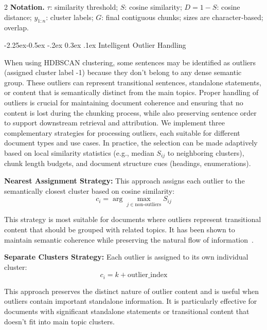 \documentclass[10pt,letterpaper]{article}
\makeatletter
\let\cite\citep
\renewcommand{\subsubsection}{\@startsection{subsubsection}{3}{\z@}%
                                     {-2.25ex\@plus -0.5ex \@minus -.2ex}%
                                     {0.3ex \@plus .1ex}%
                                     {\normalfont\normalsize\itshape}}
\makeatother
\begin{document}
\begin{multicols}{2}
\textbf{Notation.} $\tau$: similarity threshold; $S$: cosine similarity; $D{=}1{-}S$: cosine distance; $y_{1:n}$: cluster labels; $G$: final contiguous chunks; sizes are character‑based; overlap.

\subsubsection{Intelligent Outlier Handling}

\vspace{0.5em}
When using HDBSCAN clustering, some sentences may be identified as outliers (assigned cluster label -1) because they don't belong to any dense semantic group. These outliers can represent transitional sentences, standalone statements, or content that is semantically distinct from the main topics. Proper handling of outliers is crucial for maintaining document coherence and ensuring that no content is lost during the chunking process, while also preserving sentence order to support downstream retrieval and attribution. We implement three complementary strategies for processing outliers, each suitable for different document types and use cases. In practice, the selection can be made adaptively based on local similarity statistics (e.g., median $S_{ij}$ to neighboring clusters), chunk length budgets, and document structure cues (headings, enumerations).

\textbf{Nearest Assignment Strategy:} This approach assigns each outlier to the semantically closest cluster based on cosine similarity:
\begin{equation}
c_i = \arg\max_{j \in \text{non-outliers}} S_{ij}
\end{equation}

This strategy is most suitable for documents where outliers represent transitional content that should be grouped with related topics. It has been shown to maintain semantic coherence while preserving the natural flow of information~\cite{wilson2024clustering}.

\textbf{Separate Clusters Strategy:} Each outlier is assigned to its own individual cluster:
\begin{equation}
c_i = k + \text{outlier\_index}
\end{equation}

This approach preserves the distinct nature of outlier content and is useful when outliers contain important standalone information. It is particularly effective for documents with significant standalone statements or transitional content that doesn't fit into main topic clusters.


\end{multicols}
\end{document}
